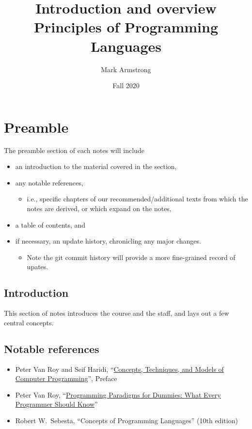 \documentclass[11pt]{article}
\author{Mark Armstrong}
\date{Fall 2020}
\title{Introduction and overview\\\medskip
\large Principles of Programming Languages}
\theoremstyle{definition}
\begin{document}
\maketitle

\section{Preamble}
\label{sec:org1e3910e}
The preamble section of each notes will include
\begin{itemize}
\item an introduction to the material covered in the section,
\item any notable references,
\begin{itemize}
\item i.e., specific chapters of our recommended/additional texts
from which the notes are derived, or which expand on the notes,
\end{itemize}
\item a table of contents, and
\item if necessary, an update history, chronicling any major changes.
\begin{itemize}
\item Note the git commit history will provide a more fine-grained
record of upates.
\end{itemize}
\end{itemize}

\subsection{Introduction}
\label{sec:orgb40a370}
This section of notes introduces the course and the staff,
and lays out a few central concepts.

\subsection{Notable references}
\label{sec:orgb5a7431}
\begin{itemize}
\item Peter Van Roy and Seif Haridi,
“\href{http://citeseerx.ist.psu.edu/viewdoc/download?doi=10.1.1.102.7366\&rep=rep1\&type=pdf}{Concepts, Techniques, and Models of Computer Programming}”,
Preface
\item Peter Van Roy, “\href{https://www.info.ucl.ac.be/\~pvr/VanRoyChapter.pdf}{Programming Paradigms for Dummies: What Every Programmer Should Know}”
\item Robert W. Sebesta, “Concepts of Programming Languages” (10th edition)
\end{itemize}
\end{document}
